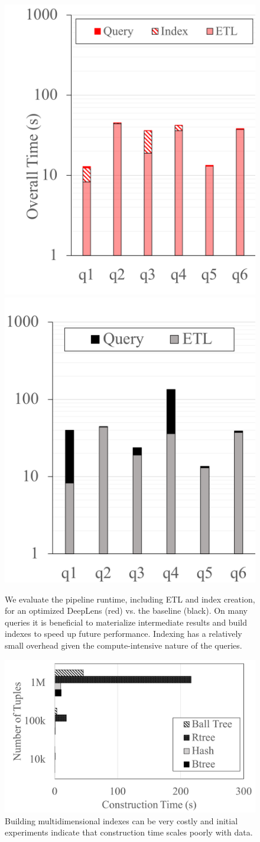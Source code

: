 \begin{figure}[t]
\centering
 \includegraphics[width=0.46\columnwidth]{figures/indexing_b.png}
 \includegraphics[width=0.49\columnwidth]{figures/indexing_a.png}
 \caption{We evaluate the pipeline runtime, including ETL and index creation, for an optimized \textsf{DeepLens} (red) vs. the baseline (black). On many queries it is beneficial to materialize intermediate results and build indexes to speed up future performance. Indexing has a relatively small overhead given the compute-intensive nature of the queries.  \label{index} }
\end{figure}

\begin{figure}[t]
\centering
 \includegraphics[width=0.8\columnwidth]{figures/indexing.png}
 \caption{Building multidimensional indexes can be very costly and initial experiments indicate that construction time scales poorly with data. \label{indexbuild} }
\end{figure}

